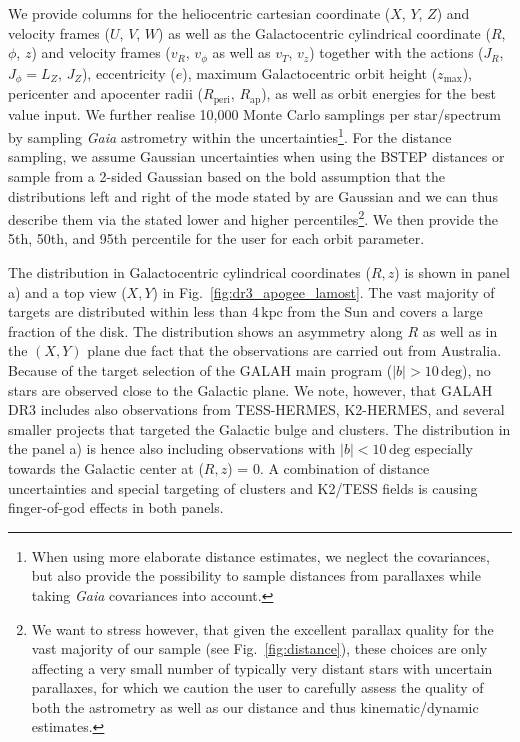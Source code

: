 \documentclass[fleqn,usenatbib,useAMS]{mnras}
\newcommand{\Gaia}{\textit{Gaia}\xspace}
\begin{document}
We provide columns for the heliocentric cartesian coordinate ($X$, $Y$, $Z$) and velocity frames ($U$, $V$, $W$) as well as the Galactocentric cylindrical coordinate ($R$, $\phi$, $z$) and velocity frames ($v_R$, $v_\phi$ as well as $v_T$, $v_z$) together with the actions ($J_R$, $J_\phi = L_Z$, $J_Z$), eccentricity ($e$), maximum Galactocentric orbit height ($z_\text{max}$), pericenter and apocenter radii ($R_\text{peri}$, $R_\text{ap}$), as well as orbit energies for the best value input. We further realise 10,000 Monte Carlo samplings per star/spectrum by sampling \Gaia astrometry within the uncertainties\footnote{When using more elaborate distance estimates, we neglect the covariances, but also provide the possibility to sample distances from parallaxes while taking \Gaia covariances into account.}. For the distance sampling, we assume Gaussian uncertainties when using the BSTEP distances or sample from a 2-sided Gaussian based on the bold assumption that the distributions left and right of the mode stated by \citet{BailerJones2018} are Gaussian and we can thus describe them via the stated lower and higher percentiles\footnote{We want to stress however, that given the excellent parallax quality for the vast majority of our sample (see Fig.~\ref{fig:distance}), these choices are only affecting a very small number of typically very distant stars with uncertain parallaxes, for which we caution the user to carefully assess the quality of both the astrometry as well as our distance and thus kinematic/dynamic estimates.}. We then provide the 5th, 50th, and 95th percentile for the user for each orbit parameter.

The distribution in Galactocentric cylindrical coordinates ($R,z$) is shown in panel a) and a top view ($X,Y$) in Fig.~\ref{fig:dr3_apogee_lamost}. The vast majority of targets are distributed within less than $4\,\mathrm{kpc}$ from the Sun and covers a large fraction of the disk. The distribution shows an asymmetry along $R$ as well as in the $(X,Y)$ plane due fact that the observations are carried out from Australia. Because of the target selection of the GALAH main program ($\vert b \vert > 10\,\mathrm{deg}$), no stars are observed close to the Galactic plane. We note, however, that GALAH DR3 includes also observations from TESS-HERMES, K2-HERMES, and several smaller projects that targeted the Galactic bulge and clusters. The distribution in the panel a) is hence also including observations with $\vert b \vert < 10\,\mathrm{deg}$ especially towards the Galactic center at ($R,z$) = 0. A combination of distance uncertainties and special targeting of clusters and K2/TESS fields is causing finger-of-god effects in both panels.
\end{document}
